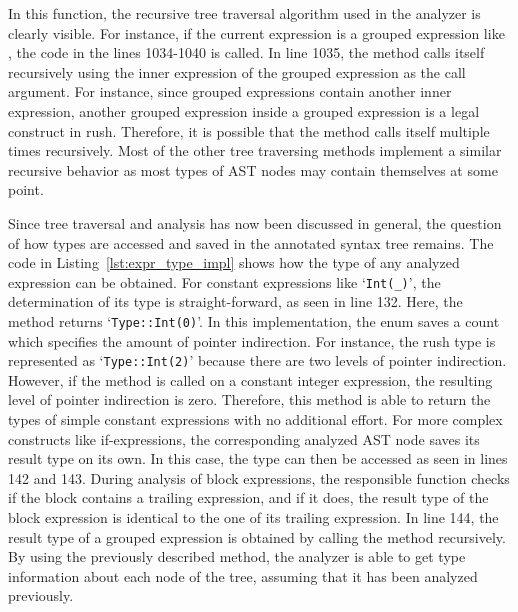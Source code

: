 In this function, the recursive tree traversal algorithm used in the analyzer is clearly visible.
For instance, if the current expression is a grouped expression like , the code in the lines 1034-1040 is called.
In line 1035, the  method calls itself recursively using the inner expression of the grouped expression as the call argument.
For instance, since grouped expressions contain another inner expression, another grouped expression inside a grouped expression is a legal construct in rush.
Therefore, it is possible that the  method calls itself multiple times recursively.
Most of the other tree traversing methods implement a similar recursive behavior as most types of AST nodes may contain themselves at some point.


Since tree traversal and analysis has now been discussed in general, the question of how types are accessed and saved in the annotated syntax tree remains.
The code in Listing~\ref{lst:expr_type_impl} shows how the type of any analyzed expression can be obtained.
For constant expressions like `\verb|Int(_)|', the determination of its type is straight-forward, as seen in line 132.
Here, the  method returns `\verb|Type::Int(0)|'.
In this implementation, the  enum saves a count which specifies the amount of pointer indirection.
For instance, the rush type  is represented as `\verb|Type::Int(2)|' because there are two levels of pointer indirection.
However, if the method is called on a constant integer expression, the resulting level of pointer indirection is zero.
Therefore, this method is able to return the types of simple constant expressions with no additional effort.
For more complex constructs like if-expressions, the corresponding analyzed AST node saves its result type on its own.
In this case, the type can then be accessed as seen in lines 142 and 143.
During analysis of block expressions, the responsible function checks if the block contains a trailing expression,
and if it does, the result type of the block expression is identical to the one of its trailing expression.
In line 144, the result type of a grouped expression is obtained by calling the  method recursively.
By using the previously described method, the analyzer is able to get type information about each node of the tree, assuming that it has been analyzed previously.

